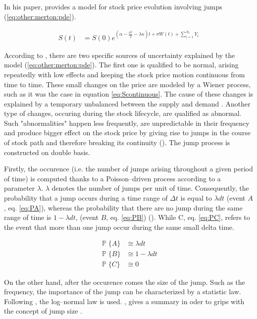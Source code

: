 \documentclass[12pt]{report}
\newcommand{\Bm}{W\left(t\right)}
\newcommand{\St}{S\left(t\right)}
\begin{document}
In his paper, \citet{merton76} provides a model for stock price evolution involving jumps (\cref{eq:other:merton:pde}). 


\begin{align}
  \St &= S\left(0\right) e^{\left(\alpha - \frac{\sigma^2}{2} - \lambda \kappa\right) t + \sigma \Bm + \sum_{i=1}^{N_t} Y_i}
  \label{eq:other:merton:pde}
\end{align}
  
According to \citet{merton76}, there are two specific sources of uncertainty explained by the model (\cref{eq:other:merton:pde}). 
The first one is qualified to be normal, arising repeatedly with low effects and keeping the stock price motion continuous from time to time. These small changes on the price are modeled by a Wiener process, such as it was the case in equation \ref{eq:Scontinuous}. The cause of these changes is explained by a temporary unbalanced between the supply and demand \citet{merton76}.
Another type of changes, occuring during the stock lifecycle, are qualified as abnormal. Such "abnormalities" happen less frequently, are unpredictable in their frequency and produce bigger effect on the stock price by giving rise to jumps in the course of stock path and therefore breaking its continuity (\citet{merton76}). The jump process is constructed on double basis. 

Firstly, the occurence (i.e. the number of jumps arising throughout a given period of time) is computed thanks to a Poisson--driven process according to a parameter $\lambda$. 
$\lambda$ denotes the number of jumps per unit of time. Consequently, the probability that a jump occurs during a time range of $\Delta t$ is equal to $\lambda dt$ (event $A$, eq. \ref{eq:PA}), whereas the probability that there are no jump during the same range of time is $1 - \lambda dt$, (event $B$, eq. \ref{eq:PB}) (\citet{matsuda2004}). While C, eq. \ref{eq:PC}, refers to the event that more than one jump occur during the same small delta time.

\begin{align}
  \mathop{\mathbb{P}} \{A\}&\cong \lambda dt  \label{eq:PA}\\
  \mathop{\mathbb{P}} \{B\}&\cong 1 - \lambda dt  \label{eq:PB}\\
  \mathop{\mathbb{P}} \{C\}&\cong   0 \label{eq:PC}
\end{align}

On the other hand, after the occurence comes the size of the jump. Such as the frequency, the importance of the jump can be characterized by a statistic law. Following \citet{heston}, the log--normal law is used. \citet{matsuda2004}, gives a summary in oder to grips with the concept of jump size  .
 
\end{document}
